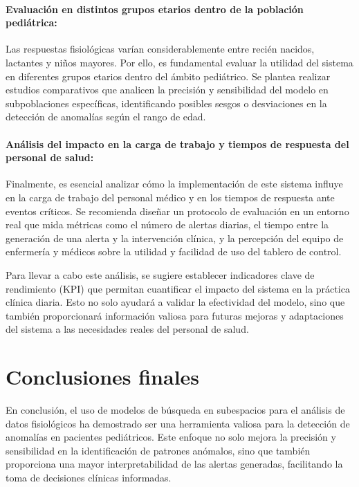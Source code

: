 \paragraph{Evaluación en distintos grupos etarios dentro de la población pediátrica:}

Las respuestas fisiológicas varían considerablemente entre recién nacidos, lactantes y niños mayores. Por ello, es fundamental evaluar la utilidad del sistema en diferentes grupos etarios dentro del ámbito pediátrico. Se plantea realizar estudios comparativos que analicen la precisión y sensibilidad del modelo en subpoblaciones específicas, identificando posibles sesgos o desviaciones en la detección de anomalías según el rango de edad.

\paragraph{Análisis del impacto en la carga de trabajo y tiempos de respuesta del personal de salud:}

Finalmente, es esencial analizar cómo la implementación de este sistema influye en la carga de trabajo del personal médico y en los tiempos de respuesta ante eventos críticos. Se recomienda diseñar un protocolo de evaluación en un entorno real que mida métricas como el número de alertas diarias, el tiempo entre la generación de una alerta y la intervención clínica, y la percepción del equipo de enfermería y médicos sobre la utilidad y facilidad de uso del tablero de control.

Para llevar a cabo este análisis, se sugiere establecer indicadores clave de rendimiento (KPI) que permitan cuantificar el impacto del sistema en la práctica clínica diaria. Esto no solo ayudará a validar la efectividad del modelo, sino que también proporcionará información valiosa para futuras mejoras y adaptaciones del sistema a las necesidades reales del personal de salud.

\section{Conclusiones finales}

En conclusión, el uso de modelos de búsqueda en subespacios para el análisis de datos fisiológicos ha demostrado ser una herramienta valiosa para la detección de anomalías en pacientes pediátricos. Este enfoque no solo mejora la precisión y sensibilidad en la identificación de patrones anómalos, sino que también proporciona una mayor interpretabilidad de las alertas generadas, facilitando la toma de decisiones clínicas informadas.

